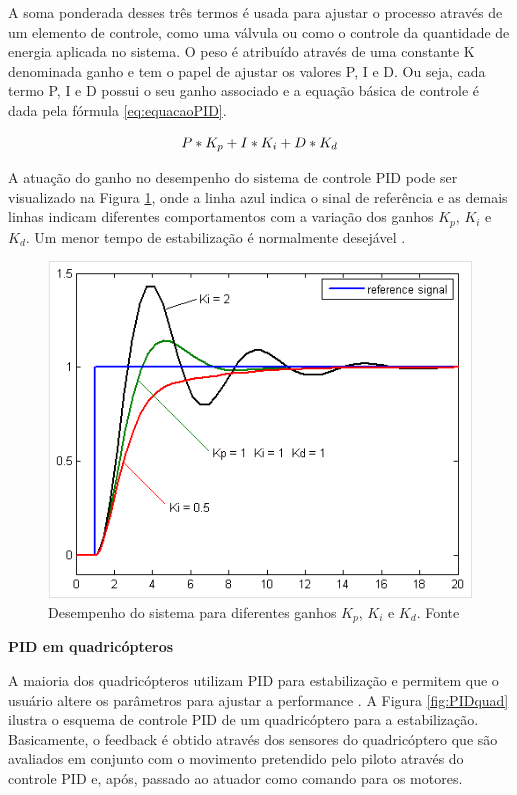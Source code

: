 \documentclass[a4paper, 12pt]{article}
\begin{document}
A soma ponderada desses três termos é usada para ajustar o processo através de um elemento de controle, como uma válvula ou como o controle da quantidade de energia aplicada no sistema. O peso é atribuído através de uma constante K denominada ganho e tem o papel de ajustar os valores P, I e D. Ou seja, cada termo P, I e D possui o seu ganho associado e a equação básica de controle é dada pela fórmula \ref{eq:equacaoPID}. 

\begin{equation}
	\centering
		P*K_p + I*K_i + D*K_d	
	\label{eq:equacaoPID}
\end{equation}

A atuação do ganho no desempenho do sistema de controle PID pode ser visualizado na Figura \ref{fig:ganhoPID}, onde a linha azul indica o sinal de referência e as demais linhas indicam diferentes comportamentos com a variação dos ganhos $K_p$, $K_i$ e $K_d$. Um menor tempo de estabilização é normalmente desejável \cite{Kingdom}.  

\begin{figure}[h]
	\centering
		\includegraphics[scale=0.5]{img/ganho_PID.png}
	\caption{Desempenho do sistema para diferentes ganhos $K_p$, $K_i$ e $K_d$. Fonte \cite{Kingdom}}
	\label{fig:ganhoPID}
\end{figure}
 
\noindent\textbf{PID em quadricópteros}

A maioria dos quadricópteros utilizam PID para estabilização e permitem que o usuário altere os parâmetros para ajustar a performance \cite{Liang}. A Figura \ref{fig:PIDquad} ilustra o esquema de controle PID de um quadricóptero para a estabilização. Basicamente, o feedback é obtido através dos sensores do quadricóptero que são avaliados em conjunto com o movimento pretendido pelo piloto através do controle PID e, após, passado ao atuador como comando para os motores. 
\end{document}
